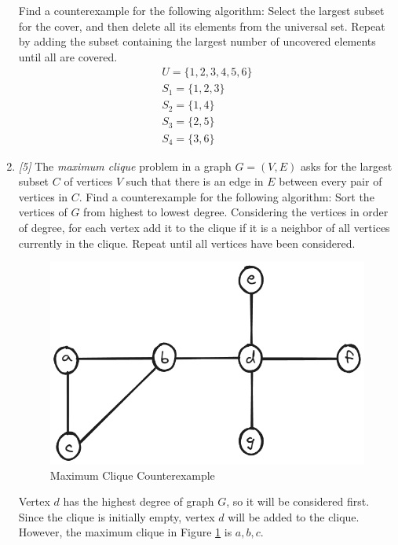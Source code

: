 \documentclass[10pt, letterpaper]{article}
\begin{document}
\begin{enumerate}
        Find a counterexample for the following algorithm: Select the largest subset for the cover,
        and then delete all its elements from the universal set. Repeat by adding the subset
        containing the largest number of uncovered elements until all are covered.
        \begin{gather*}
            U = \{1, 2, 3, 4, 5, 6\} \\
            S_1 = \{1, 2, 3\} \\
            S_2 = \{1, 4\} \\
            S_3 = \{2, 5\} \\
            S_4 = \{3, 6\}
        \end{gather*}

        \item \textit{[5]} The \textit{maximum clique} problem in a graph $G = (V, E)$ asks for the
        largest subset $C$ of vertices $V$ such that there is an edge in $E$ between every pair of
        vertices in $C$. Find a counterexample for the following algorithm: Sort the vertices of $G$
        from highest to lowest degree. Considering the vertices in order of degree, for each vertex
        add it to the clique if it is a neighbor of all vertices currently in the clique. Repeat
        until all vertices have been considered.
        \begin{figure}[H]
            \centering
            \includegraphics[scale=0.25]{01-07.png}
            \caption{Maximum Clique Counterexample}
            \label{fig:max-clique}
        \end{figure}
        Vertex $d$ has the highest degree of graph $G$, so it will be considered first. Since the
        clique is initially empty, vertex $d$ will be added to the clique. However, the maximum
        clique in Figure \ref{fig:max-clique} is $a, b, c$.
    \end{enumerate}
\end{document}
